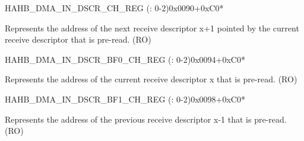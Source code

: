 \begin{register}{H}{AHB\_DMA\_IN\_DSCR\_CH\_REG (: 0-2)}{0x0090+0xC0*}\label{regdesc:AHBDMAINDSCRCHNREG}
%
\regnewline%
\begin{regdesc}\begin{reglist}
\label{fielddesc:AHBDMAINLINKDSCRCHN}\item [AHB\_DMA\_INLINK\_DSCR\_CH\regindex{n}] Represents the address of the next receive descriptor x+1 pointed by the current receive descriptor that is pre-read. (RO)
\end{reglist}\end{regdesc}
\end{register}


\begin{register}{H}{AHB\_DMA\_IN\_DSCR\_BF0\_CH\_REG (: 0-2)}{0x0094+0xC0*}\label{regdesc:AHBDMAINDSCRBF0CHNREG}
%
\regnewline%
\begin{regdesc}\begin{reglist}
\label{fielddesc:AHBDMAINLINKDSCRBF0CHN}\item [AHB\_DMA\_INLINK\_DSCR\_BF0\_CH\regindex{n}] Represents the address of the current receive descriptor x that is pre-read. (RO)
\end{reglist}\end{regdesc}
\end{register}


\begin{register}{H}{AHB\_DMA\_IN\_DSCR\_BF1\_CH\_REG (: 0-2)}{0x0098+0xC0*}\label{regdesc:AHBDMAINDSCRBF1CHNREG}
%
\regnewline%
\begin{regdesc}\begin{reglist}
\label{fielddesc:AHBDMAINLINKDSCRBF1CHN}\item [AHB\_DMA\_INLINK\_DSCR\_BF1\_CH\regindex{n}] Represents the address of the previous receive descriptor x-1 that is pre-read. (RO)
\end{reglist}\end{regdesc}
\end{register}


